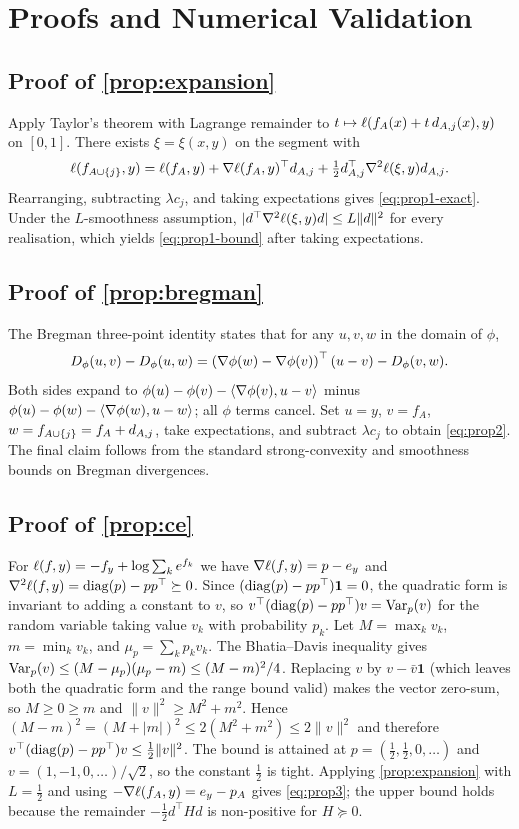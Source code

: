 \appendix
\section{Proofs and Numerical Validation}
\label{app:proofs}

\subsection{Proof of \cref{prop:expansion}}
Apply Taylor's theorem with Lagrange remainder to
$t\mapsto\ell(f_A(x)+t\,d_{A,j}(x),y)$ on $[0,1]$. There exists
$\xi=\xi(x,y)$ on the segment with
\begin{equation}
 \ell(f_{A\cup\{j\}},y)
 =
 \ell(f_A,y)+\nabla\ell(f_A,y)^\top d_{A,j}
 +\tfrac12 d_{A,j}^\top\nabla^2\ell(\xi,y)d_{A,j}.
\end{equation}
Rearranging, subtracting $\lambda c_j$, and taking expectations gives
\cref{eq:prop1-exact}. Under the $L$-smoothness assumption,
$|d^\top\nabla^2\ell(\xi,y)d|\leq L\|d\|^2$ for every realisation, which
yields \cref{eq:prop1-bound} after taking expectations.

\subsection{Proof of \cref{prop:bregman}}
The Bregman three-point identity states that for any $u,v,w$ in the domain of
$\phi$,
\begin{equation}
 D_\phi(u,v)-D_\phi(u,w)
 =
 \left(\nabla\phi(w)-\nabla\phi(v)\right)^\top(u-v)-D_\phi(v,w).
\end{equation}
Both sides expand to
$\phi(u)-\phi(v)-\langle\nabla\phi(v),u-v\rangle$ minus
$\phi(u)-\phi(w)-\langle\nabla\phi(w),u-w\rangle$; all $\phi$ terms cancel.
Set $u=y$, $v=f_A$, $w=f_{A\cup\{j\}}=f_A+d_{A,j}$, take expectations, and
subtract $\lambda c_j$ to obtain \cref{eq:prop2}. The final claim follows from
the standard strong-convexity and smoothness bounds on Bregman divergences.

\subsection{Proof of \cref{prop:ce}}
For $\ell(f,y)=-f_y+\log\sum_k e^{f_k}$ we have
$\nabla\ell(f,y)=p-e_y$ and
$\nabla^2\ell(f,y)=\mathrm{diag}(p)-pp^\top\succeq0$. Since
$(\mathrm{diag}(p)-pp^\top)\mathbf{1}=0$, the quadratic form is invariant to adding a
constant to $v$, so
$v^\top(\mathrm{diag}(p)-pp^\top)v=\operatorname{Var}_p(v)$ for the random variable taking value
$v_k$ with probability $p_k$. Let $M=\max_k v_k$, $m=\min_k v_k$, and
$\mu_p=\sum_k p_k v_k$. The Bhatia--Davis inequality gives
$\operatorname{Var}_p(v)\leq(M-\mu_p)(\mu_p-m)\leq(M-m)^2/4$. Replacing $v$ by
$v-\bar v\mathbf{1}$ (which leaves both the quadratic form and the range bound
valid) makes the vector zero-sum, so $M\geq0\geq m$ and
$\|v\|^2\geq M^2+m^2$. Hence
$(M-m)^2=(M+|m|)^2\leq2(M^2+m^2)\leq2\|v\|^2$ and therefore
$v^\top(\mathrm{diag}(p)-pp^\top)v\leq\tfrac12\|v\|^2$. The bound is attained at
$p=(\tfrac12,\tfrac12,0,\dots)$ and $v=(1,-1,0,\dots)/\sqrt2$, so the constant
$\tfrac12$ is tight. Applying \cref{prop:expansion} with $L=\tfrac12$ and using
$-\nabla\ell(f_A,y)=e_y-p_A$ gives \cref{eq:prop3}; the upper bound holds
because the remainder $-\tfrac12 d^\top H d$ is non-positive for $H\succeq0$.


